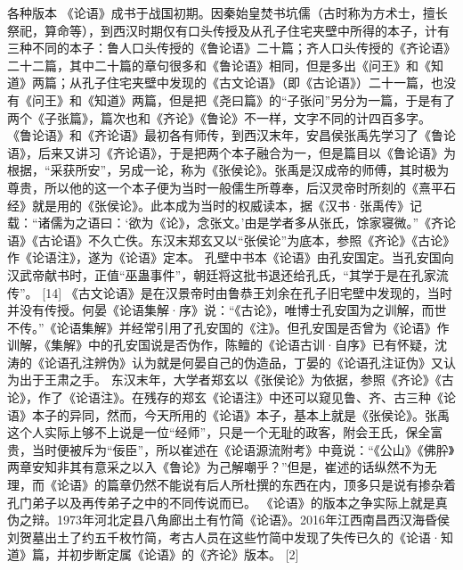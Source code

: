 \documentclass[a4paper,12pt,UTF8,twoside]{ctexbook}
\begin{document}
各种版本
《论语》成书于战国初期。因秦始皇焚书坑儒（古时称为方术士，擅长祭祀，算命等），到西汉时期仅有口头传授及从孔子住宅夹壁中所得的本子，计有三种不同的本子：鲁人口头传授的《鲁论语》二十篇；齐人口头传授的《齐论语》二十二篇，其中二十篇的章句很多和《鲁论语》相同，但是多出《问王》和《知道》两篇；从孔子住宅夹壁中发现的《古文论语》（即《古论语》）二十一篇，也没有《问王》和《知道》两篇，但是把《尧曰篇》的“子张问”另分为一篇，于是有了两个《子张篇》，篇次也和《齐论》《鲁论》不一样，文字不同的计四百多字。
《鲁论语》和《齐论语》最初各有师传，到西汉末年，安昌侯张禹先学习了《鲁论语》，后来又讲习《齐论语》，于是把两个本子融合为一，但是篇目以《鲁论语》为根据，“采获所安”，另成一论，称为《张侯论》。张禹是汉成帝的师傅，其时极为尊贵，所以他的这一个本子便为当时一般儒生所尊奉，后汉灵帝时所刻的《熹平石经》就是用的《张侯论》。此本成为当时的权威读本，据《汉书·张禹传》记载：“诸儒为之语曰：‘欲为《论》，念张文。’由是学者多从张氏，馀家寝微。”《齐论语》《古论语》不久亡佚。东汉末郑玄又以“张侯论”为底本，参照《齐论》《古论》作《论语注》，遂为《论语》定本。
孔壁中书本《论语》由孔安国定。当孔安国向汉武帝献书时，正值“巫蛊事件”，朝廷将这批书退还给孔氏，“其学于是在孔家流传”。 [14]
《古文论语》是在汉景帝时由鲁恭王刘余在孔子旧宅壁中发现的，当时并没有传授。何晏《论语集解·序》说：“《古论》，唯博士孔安国为之训解，而世不传。”《论语集解》并经常引用了孔安国的《注》。但孔安国是否曾为《论语》作训解，《集解》中的孔安国说是否伪作，陈鳣的《论语古训·自序》已有怀疑，沈涛的《论语孔注辨伪》认为就是何晏自己的伪造品，丁晏的《论语孔注证伪》又认为出于王肃之手。
东汉末年，大学者郑玄以《张侯论》为依据，参照《齐论》《古论》，作了《论语注》。在残存的郑玄《论语注》中还可以窥见鲁、齐、古三种《论语》本子的异同，然而，今天所用的《论语》本子，基本上就是《张侯论》。张禹这个人实际上够不上说是一位“经师”，只是一个无耻的政客，附会王氏，保全富贵，当时便被斥为“佞臣”，所以崔述在《论语源流附考》中竟说：“《公山》《佛肸》两章安知非其有意采之以入《鲁论》为己解嘲乎？”但是，崔述的话纵然不为无理，而《论语》的篇章仍然不能说有后人所杜撰的东西在内，顶多只是说有掺杂着孔门弟子以及再传弟子之中的不同传说而已。
《论语》的版本之争实际上就是真伪之辩。1973年河北定县八角廊出土有竹简《论语》。2016年江西南昌西汉海昏侯刘贺墓出土了约五千枚竹简，考古人员在这些竹简中发现了失传已久的《论语·知道》篇，并初步断定属《论语》的《齐论》版本。 [2]
\end{document}
